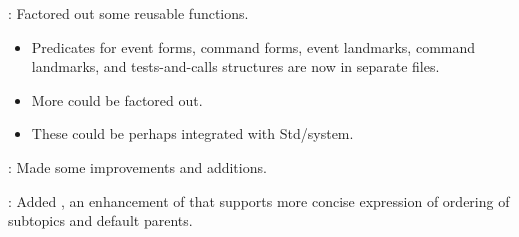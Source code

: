 
\begin{frame}

\implibtitle

:
Factored out some reusable functions.
\begin{itemize}
\item
Predicates for
event forms,
command forms,
event landmarks,
command landmarks, and
tests-and-calls structures
are now in separate files.
\item
More could be factored out.
\item
These could be perhaps integrated with Std/system. 
\end{itemize}

\end{frame}


\begin{frame}

\implibtitle

:
Made some improvements and additions.

\separation

:
Added , an enhancement of 
that supports more concise expression of
ordering of subtopics and default parents.

\end{frame}



